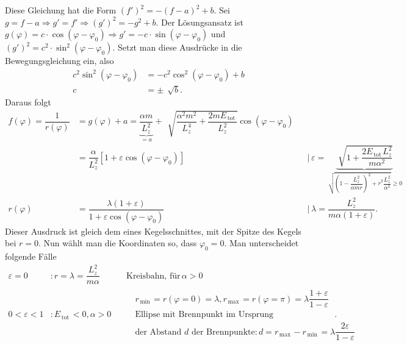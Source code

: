 \documentclass[a4paper,12pt]{article}
\numberwithin{equation}{section}
\begin{document}
Diese Gleichung hat die Form $\left(f'\right)^2=-\left(f-a\right)^2+b$. Sei $g=f-a\Rightarrow g'=f'\Rightarrow \left(g'\right)^2=-g^2+b$. Der Lösungsansatz ist $g\left(\varphi \right)=c\cdot \cos \left(\varphi -\varphi _0\right)\Rightarrow g'=-c\cdot \sin \left(\varphi -\varphi _0\right)$ und $\left(g'\right)^2=c^2\cdot \sin ^2\left(\varphi -\varphi _0\right)$. Setzt man diese Ausdrücke in die Bewegungsgleichung ein, also
\begin{align*}
        c^2\sin ^2\left(\varphi -\varphi _0\right)&=-c^2\cos ^2\left(\varphi -\varphi _0\right)+b\\
        c&=\pm \,\sqrt[]{b}
.\end{align*}
Daraus folgt
\begin{align*}
        f\left(\varphi \right)=\dfrac{1}{r\left(\varphi \right)}&=g\left(\varphi \right)+a=\underbrace{\dfrac{\alpha m}{L_z^2}}_{=a}+\,\sqrt[]{\dfrac{\alpha ^2m^2}{L_z^4}+\dfrac{2mE_{\,\text{tot}\,}}{L_z^2}}\cos \left(\varphi -\varphi _0\right)\\
                                                                &=\dfrac{\alpha }{L_z^2}\left[1+\varepsilon \cos \left(\varphi -\varphi _0\right)\right]&&|\,\varepsilon =\underbrace{\sqrt[]{1+\dfrac{2E_{\,\text{tot}\,}L_z^2}{m\alpha ^2}} }_{\sqrt[]{\left(1-\dfrac{L_z^2}{\alpha mr}\right)^2+\dot{r}^2\dfrac{L_z^2}{\alpha ^2}}\geq 0}\\
        r\left(\varphi \right)&=\dfrac{\lambda \left(1+\varepsilon \right)}{1+\varepsilon \cos \left(\varphi -\varphi _0\right)}&&|\,\lambda =\dfrac{L_z^2}{m\alpha \left(1+\varepsilon \right)}
.\end{align*}
Dieser Ausdruck ist gleich dem eines Kegelsschnittes, mit der Spitze des Kegels bei $r=0$. Nun wählt man die Koordinaten so, dass $\varphi _0=0$. Man unterscheidet folgende Fälle
\begin{align*}
        \varepsilon =0&:r=\lambda =\dfrac{L_z^2}{m\alpha }&&\,\text{Kreisbahn, für}\,\alpha >0\\
        0<\varepsilon <1&:E_{\,\text{tot}\,}<0,\alpha >0&&\begin{aligned}
                &r_{\,\text{min}\,}=r\left(\varphi =0\right)=\lambda ,r_{\,\text{max}\,}=r\left(\varphi =\pi \right)=\lambda \dfrac{1+\varepsilon }{1-\varepsilon }\\
                &\text{Ellipse mit Brennpunkt im Ursprung}\,\\
                &\text{der Abstand $d$ der Brennpunkte:}\,d=r_{\,\text{max}\,}-r_{\,\text{min}\,}=\lambda \dfrac{2\varepsilon }{1-\varepsilon }
        \end{aligned}
.\end{align*}
\end{document}
